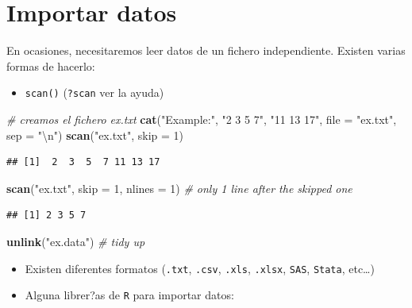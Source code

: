 \documentclass[]{book}
\newenvironment{Shaded}{\begin{snugshade}}{\end{snugshade}}
\newcommand{\KeywordTok}[1]{\textcolor[rgb]{0.13,0.29,0.53}{\textbf{#1}}}
\newcommand{\DataTypeTok}[1]{\textcolor[rgb]{0.13,0.29,0.53}{#1}}
\newcommand{\DecValTok}[1]{\textcolor[rgb]{0.00,0.00,0.81}{#1}}
\newcommand{\CharTok}[1]{\textcolor[rgb]{0.31,0.60,0.02}{#1}}
\newcommand{\StringTok}[1]{\textcolor[rgb]{0.31,0.60,0.02}{#1}}
\newcommand{\CommentTok}[1]{\textcolor[rgb]{0.56,0.35,0.01}{\textit{#1}}}
\newcommand{\NormalTok}[1]{#1}
\providecommand{\tightlist}{%
  \setlength{\itemsep}{0pt}\setlength{\parskip}{0pt}}
\begin{document}
\section{Importar datos}\label{importar-datos}

En ocasiones, necesitaremos leer datos de un fichero independiente.
Existen varias formas de hacerlo:

\begin{itemize}
\tightlist
\item
  \texttt{scan()} (\texttt{?scan} ver la ayuda)
\end{itemize}

\begin{Shaded}
\begin{Highlighting}[]
\CommentTok{# creamos el fichero ex.txt}
\KeywordTok{cat}\NormalTok{(}\StringTok{"Example:"}\NormalTok{, }\StringTok{"2 3 5 7"}\NormalTok{, }\StringTok{"11 13 17"}\NormalTok{, }\DataTypeTok{file =} \StringTok{"ex.txt"}\NormalTok{, }\DataTypeTok{sep =} \StringTok{"}\CharTok{\textbackslash{}n}\StringTok{"}\NormalTok{) }
\KeywordTok{scan}\NormalTok{(}\StringTok{"ex.txt"}\NormalTok{, }\DataTypeTok{skip =} \DecValTok{1}\NormalTok{)}
\end{Highlighting}
\end{Shaded}

\begin{verbatim}
## [1]  2  3  5  7 11 13 17
\end{verbatim}

\begin{Shaded}
\begin{Highlighting}[]
\KeywordTok{scan}\NormalTok{(}\StringTok{"ex.txt"}\NormalTok{, }\DataTypeTok{skip =} \DecValTok{1}\NormalTok{, }\DataTypeTok{nlines =} \DecValTok{1}\NormalTok{) }\CommentTok{# only 1 line after the skipped one}
\end{Highlighting}
\end{Shaded}

\begin{verbatim}
## [1] 2 3 5 7
\end{verbatim}

\begin{Shaded}
\begin{Highlighting}[]
\KeywordTok{unlink}\NormalTok{(}\StringTok{"ex.data"}\NormalTok{) }\CommentTok{# tidy up}
\end{Highlighting}
\end{Shaded}

\begin{itemize}
\item
  Existen diferentes formatos (\texttt{.txt}, \texttt{.csv},
  \texttt{.xls}, \texttt{.xlsx}, \texttt{SAS}, \texttt{Stata},
  etc\ldots{})
\item
  Alguna librer?as de \texttt{R} para importar datos:
\end{itemize}
\end{document}
